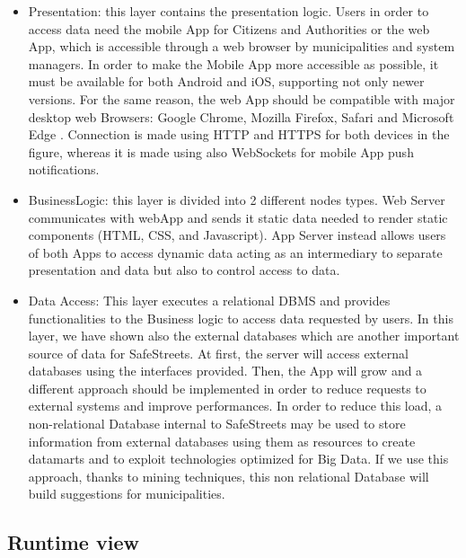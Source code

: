 \begin{itemize}
\item Presentation: this layer contains the presentation logic. Users in order to access data need the mobile App for Citizens and Authorities or the web App, which is accessible through a web browser by municipalities and system managers. In order to make the Mobile App more accessible as possible, it must be available for both Android and iOS, supporting not only newer versions. For the same reason, the web App should be compatible with major desktop web Browsers: Google Chrome, Mozilla Firefox, Safari and Microsoft Edge . Connection is made using HTTP and HTTPS for both devices in the figure, whereas it is made using also WebSockets for mobile App push notifications.
\item BusinessLogic: this layer is divided into 2 different nodes types. Web Server communicates with webApp and sends it static data needed to render static components (HTML, CSS, and Javascript). App Server instead allows users of both Apps to access dynamic data acting as an intermediary to separate presentation and data but also to control access to data. 
\item Data Access: This layer executes a relational DBMS and provides functionalities to the Business logic to access data requested by users. In this layer, we have shown also the external databases which are another important source of data for SafeStreets. At first, the server will access external databases using the interfaces provided. Then, the App will grow and a different approach should be implemented in order to reduce requests to external systems and improve performances. In order to reduce this load, a non-relational Database internal to SafeStreets may be used to store information from external databases using them as resources to create datamarts and to exploit technologies optimized for Big Data. If we use this approach, thanks to mining techniques, this non relational Database will build suggestions for municipalities.
\end{itemize}
\newpage
\subsection{Runtime view}
